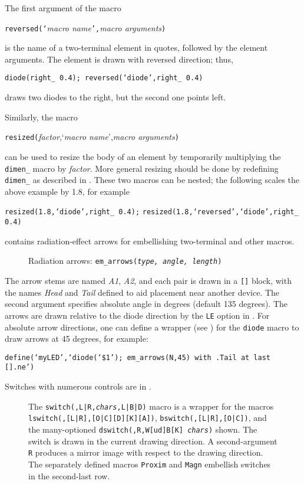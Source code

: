 The first argument of the macro
\par
{\tt reversed(`}{\sl macro name}{\tt',}{\sl macro arguments}{\tt )}
\par
\noindent
is the name of a two-terminal element in quotes, followed by the
element arguments.  The element is drawn with reversed direction; thus,
\par
{\tt diode(right\_ 0.4); reversed(`diode',right\_ 0.4)}
\par
\noindent
draws two diodes to the right, but the second one points left.

Similarly, the macro
\par
{\tt resized(}{\sl factor},`{\sl macro name}',{\sl macro arguments}{\tt )}
\par
\noindent
can be used to resize the body of an element by temporarily multiplying
the {\tt dimen\_} macro by {\sl factor}. More general resizing should be
done by redefining {\tt dimen\_} as described in .
These two macros can be nested; the following scales the above example
by 1.8, for example
\par
{\tt resized(1.8,`diode',right\_ 0.4);}
{\tt resized(1.8,`reversed',`diode',right\_ 0.4)}

 contains radiation-effect arrows for embellishing two-terminal
and other macros.
\begin{figure}[h!]
   
   \caption{Radiation arrows: {\tt em\_arrows({\sl type, angle, length})}}
   \label{Emarrows}
   \end{figure}
The arrow stems are named {\sl A1}, {\sl A2},
and each pair is drawn in a \verb|[]| block, with
the names {\sl Head} and {\sl Tail} defined to
aid placement near another device.  The second argument specifies
absolute angle in degrees (default 135 degrees).
The arrows are drawn relative to the diode direction by the {\tt LE}
option in .  For absolute arrow directions, one can
define a wrapper (see ) for the {\tt diode} macro to draw arrows
at 45 degrees, for example:
\par
{\tt define(`myLED',`diode(`\$1'); em\_arrows(N,45)
 with .Tail at last [].ne')}

\enlargethispage{\baselineskip}
Switches with numerous controls are in .
\begin{figure}[h!]
   
   \caption{The
     {\tt switch(\linespec,L|R,{\sl chars},L|B|D)}
     macro is a wrapper for the macros 
     {\tt lswitch(\linespec,[L|R],[O|C][D][K][A])},
     {\tt bswitch(\linespec,[L|R],[O|C])},
     and the many-optioned
     {\tt dswitch(\linespec,R,W[ud]B[K] {\sl chars})} shown.
     The switch is drawn in the current drawing direction.
     A second-argument {\tt R} produces a mirror
     image with respect to the drawing direction.
     The separately defined macros {\tt Proxim} and {\tt Magn}
     embellish switches in the second-last row.}
   \label{Switches}
   \end{figure}

